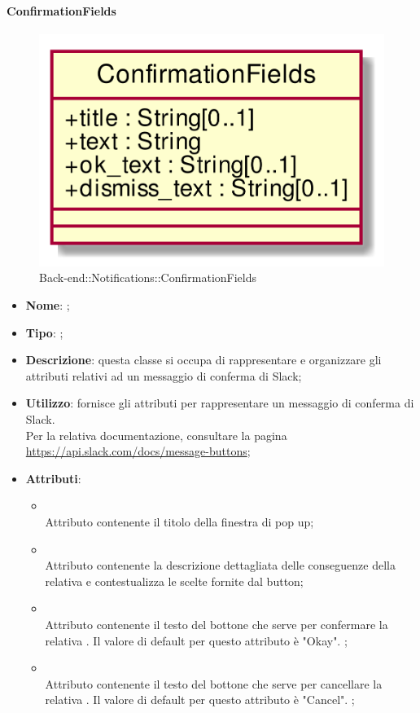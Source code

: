 \hypertarget{ConfirmationFields_label}{\paragraph{ConfirmationFields}}
\begin{figure}[h]
	\centering
	\includegraphics[width=\textwidth,height=\textheight,keepaspectratio]{images/ClassConfirmationFields.png}
	\caption{Back-end::Notifications::ConfirmationFields}
\end{figure}
\begin{itemize}
	\item \textbf{Nome}: ;
	\item \textbf{Tipo}: ;
	\item \textbf{Descrizione}: questa classe si occupa di rappresentare e organizzare gli attributi relativi ad un messaggio di conferma di Slack;
	\item \textbf{Utilizzo}: fornisce gli attributi per rappresentare un messaggio di conferma di Slack.
\\
Per la relativa documentazione, consultare la pagina \url{https://api.slack.com/docs/message-buttons};
	\item \textbf{Attributi}:
	\begin{itemize}
		\item[]  \\
		Attributo contenente il titolo della finestra di pop up;
		\item[]  \\
		Attributo contenente la descrizione dettagliata delle conseguenze della relativa  e contestualizza le scelte fornite dal button;
		\item[]  \\
		Attributo contenente il testo del bottone che serve per confermare la relativa . Il valore di default per questo attributo è "Okay".
;
		\item[]  \\
		Attributo contenente il testo del bottone che serve per cancellare la relativa . Il valore di default per questo attributo è "Cancel". ;
	\end{itemize}
\end{itemize}

